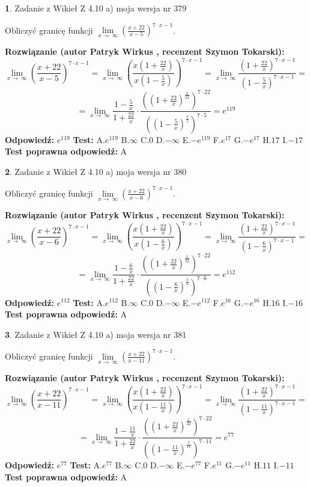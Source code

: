 \documentclass[12pt, a4paper]{article}
\theoremstyle{definition} %
\newtheorem{zad}{}
\newcommand{\zadStart}[1]{\begin{zad}#1\newline}
\newcommand{\zadStop}{\end{zad}}
\newcommand{\rozwStart}[2]{\noindent \textbf{Rozwiązanie (autor #1 , recenzent #2): }\newline}
\newcommand{\rozwStop}{\newline}
\newcommand{\odpStart}{\noindent \textbf{Odpowiedź:}\newline}
\newcommand{\odpStop}{\newline}
\newcommand{\testStart}{\noindent \textbf{Test:}\newline}
\newcommand{\testStop}{\newline}
\newcommand{\kluczStart}{\noindent \textbf{Test poprawna odpowiedź:}\newline}
\newcommand{\kluczStop}{\newline}
\begin{document}
\zadStart{Zadanie z Wikieł Z 4.10 a) moja wersja nr 379}

Obliczyć granicę funkcji  $\lim\limits_{x\to\ \infty}(\frac{x+22}{x-5})^{7\cdot x-1}$.
\zadStop
\rozwStart{Patryk Wirkus}{Szymon Tokarski}
$$\lim\limits_{x\to\ \infty}(\frac{x+22}{x-5})^{7\cdot x-1} = \lim\limits_{x\to\ \infty}(\frac{x(1+\frac{22}{x})}{x(1-\frac{5}{x})})^{7\cdot x-1}=\lim\limits_{x\to\ \infty}\frac{(1+\frac{22}{x})^{7\cdot x-1}}{(1-\frac{5}{x})^{7\cdot x-1}}=$$
$$=\lim\limits_{x\to\ \infty}\frac{1-\frac{5}{x}}{1+\frac{22}{x}}\cdot\frac{((1+\frac{22}{x})^{\frac{x}{22}})^{7\cdot22}}{((1-\frac{5}{x})^{\frac{x}{5}})^{7\cdot5}}=e^{119}$$
\rozwStop
\odpStart
$e^{119}$
\odpStop
\testStart
A.$e^{119}$ B.$\infty$ C.$0$ D.$-\infty$ E.$-e^{119}$
F.$e^{17}$ G.$-e^{17}$
H.$17$
I.$-17$
\testStop
\kluczStart
A
\kluczStop



\zadStart{Zadanie z Wikieł Z 4.10 a) moja wersja nr 380}

Obliczyć granicę funkcji  $\lim\limits_{x\to\ \infty}(\frac{x+22}{x-6})^{7\cdot x-1}$.
\zadStop
\rozwStart{Patryk Wirkus}{Szymon Tokarski}
$$\lim\limits_{x\to\ \infty}(\frac{x+22}{x-6})^{7\cdot x-1} = \lim\limits_{x\to\ \infty}(\frac{x(1+\frac{22}{x})}{x(1-\frac{6}{x})})^{7\cdot x-1}=\lim\limits_{x\to\ \infty}\frac{(1+\frac{22}{x})^{7\cdot x-1}}{(1-\frac{6}{x})^{7\cdot x-1}}=$$
$$=\lim\limits_{x\to\ \infty}\frac{1-\frac{6}{x}}{1+\frac{22}{x}}\cdot\frac{((1+\frac{22}{x})^{\frac{x}{22}})^{7\cdot22}}{((1-\frac{6}{x})^{\frac{x}{6}})^{7\cdot6}}=e^{112}$$
\rozwStop
\odpStart
$e^{112}$
\odpStop
\testStart
A.$e^{112}$ B.$\infty$ C.$0$ D.$-\infty$ E.$-e^{112}$
F.$e^{16}$ G.$-e^{16}$
H.$16$
I.$-16$
\testStop
\kluczStart
A
\kluczStop



\zadStart{Zadanie z Wikieł Z 4.10 a) moja wersja nr 381}

Obliczyć granicę funkcji  $\lim\limits_{x\to\ \infty}(\frac{x+22}{x-11})^{7\cdot x-1}$.
\zadStop
\rozwStart{Patryk Wirkus}{Szymon Tokarski}
$$\lim\limits_{x\to\ \infty}(\frac{x+22}{x-11})^{7\cdot x-1} = \lim\limits_{x\to\ \infty}(\frac{x(1+\frac{22}{x})}{x(1-\frac{11}{x})})^{7\cdot x-1}=\lim\limits_{x\to\ \infty}\frac{(1+\frac{22}{x})^{7\cdot x-1}}{(1-\frac{11}{x})^{7\cdot x-1}}=$$
$$=\lim\limits_{x\to\ \infty}\frac{1-\frac{11}{x}}{1+\frac{22}{x}}\cdot\frac{((1+\frac{22}{x})^{\frac{x}{22}})^{7\cdot22}}{((1-\frac{11}{x})^{\frac{x}{11}})^{7\cdot11}}=e^{77}$$
\rozwStop
\odpStart
$e^{77}$
\odpStop
\testStart
A.$e^{77}$ B.$\infty$ C.$0$ D.$-\infty$ E.$-e^{77}$
F.$e^{11}$ G.$-e^{11}$
H.$11$
I.$-11$
\testStop
\kluczStart
A
\kluczStop
\end{document}

